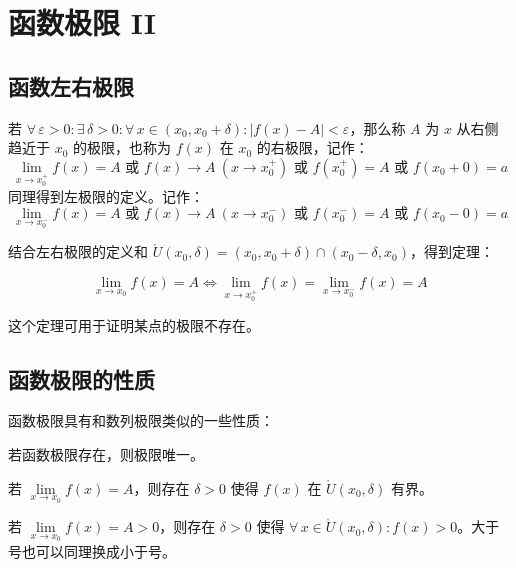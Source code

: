 \section{函数极限 II}

\subsection{函数左右极限}

\begin{definition}
	若 $\forall\,\varepsilon > 0: \exists\,\delta > 0: \forall\,x \in (x_0, x_0 + \delta): |f(x) - A| < \varepsilon$，那么称 $A$ 为 $x$ 从右侧趋近于 $x_0$ 的极限，也称为 $f(x)$ 在 $x_0$ 的右极限，记作：
	$$
	\lim_{x \to x_0^+} f(x) = A \text{ 或 } f(x) \to A\ (x \to x_0^+) \text{ 或 } f(x_0^+) = A \text{ 或 } f(x_0+0) = a
	$$
	同理得到左极限的定义。记作：
	$$
	\lim_{x \to x_0^-} f(x) = A \text{ 或 } f(x) \to A\ (x \to x_0^-) \text{ 或 } f(x_0^-) = A \text{ 或 } f(x_0-0) = a
	$$
\end{definition}

结合左右极限的定义和 $\mathring{U}(x_0, \delta) = (x_0, x_0 + \delta) \cap (x_0 - \delta, x_0)$，得到定理：

\begin{theorem}
	$$
	\lim_{x \to x_0} f(x) = A \Leftrightarrow \lim_{x \to x_0^+} f(x) = \lim_{x \to x_0^-} f(x) = A
	$$
\end{theorem}

这个定理可用于证明某点的极限不存在。

\subsection{函数极限的性质}

函数极限具有和数列极限类似的一些性质：

\begin{theorem}[极限的唯一性]
	若函数极限存在，则极限唯一。	
\end{theorem}

\begin{theorem}[极限的局部有界性]
	若 $\lim\limits_{x \to x_0} f(x) = A$，则存在 $\delta > 0$ 使得 $f(x)$ 在 $\mathring{U}(x_0, \delta)$ 有界。	
\end{theorem}

\begin{theorem}[极限的局部保号性]
	若 $\lim\limits_{x \to x_0} f(x) = A > 0$，则存在 $\delta > 0$ 使得 $\forall\,x \in \mathring{U}(x_0, \delta): f(x) > 0$。大于号也可以同理换成小于号。
\end{theorem}


